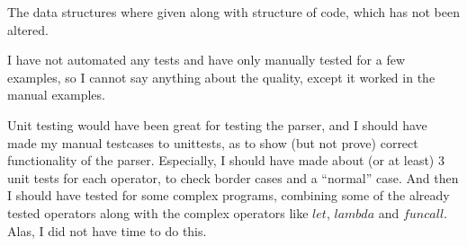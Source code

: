 \documentclass[a4paper, 10pt]{article}
\begin{document}
The data structures where given along with structure of code, which has not been altered.

I have not automated any tests and have only manually tested for a few examples, so I cannot say anything about the quality, except it worked in the manual examples.

Unit testing would have been great for testing the parser, and I should have made my manual testcases to unittests, as to show (but not prove) correct functionality of the parser. Especially, I should have made about (or at least) 3 unit tests for each operator, to check border cases and a ``normal'' case. And then I should have tested for some complex programs, combining some of the already tested operators along with the complex operators like $let$, $lambda$ and $funcall$. Alas, I did not have time to do this.

\end{document}
